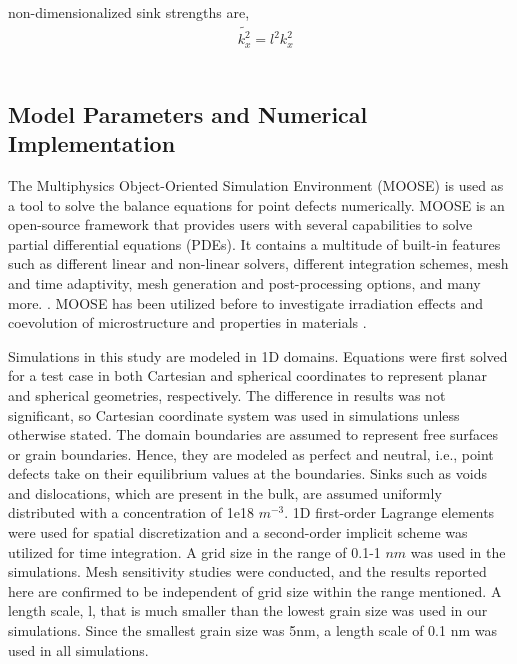 \documentclass[utf8]{frontiersSCNS} %
\begin{document}
    non-dimensionalized sink strengths are,
    \begin{equation}
      \begin{aligned}
        &\widetilde{k_{x}^2}={l^2 k_{x}^2}
      \end{aligned}
      \label{equation:non-dimensionalized_parameters_sink_strength}
    \end{equation}\\
    
\subsection{Model Parameters and Numerical Implementation}

    The Multiphysics Object-Oriented Simulation Environment (MOOSE) is used as a tool to solve the balance equations for point defects numerically. MOOSE is an open-source framework that provides users with several capabilities to solve partial differential equations (PDEs). It contains a multitude of built-in features such as different linear and non-linear solvers, different integration schemes, mesh and time adaptivity, mesh generation and post-processing options, and many more. \citep{permann2020}. MOOSE has been utilized before to investigate irradiation effects and coevolution of microstructure and properties in materials \citep{ahmed2020,tonks2018,ahmed2018,ozturk2018,ozturk2019,abdoelatef2019,badry2019,badry2021}.
    
    Simulations in this study are modeled in 1D domains. Equations were first solved for a test case in both Cartesian and spherical coordinates to represent planar and spherical geometries, respectively. The difference in results was not significant, so Cartesian coordinate system was used in simulations unless otherwise stated. The domain boundaries are assumed to represent free surfaces or grain boundaries. Hence, they are modeled as perfect and neutral, i.e., point defects take on their equilibrium values at the boundaries. Sinks such as voids and dislocations, which are present in the bulk, are assumed uniformly distributed with a concentration of 1e18 $m^{-3}$. 1D first-order Lagrange elements were used for spatial discretization and a second-order implicit scheme was utilized for time integration. A grid size in the range of 0.1-1 $nm$ was used in the simulations. Mesh sensitivity studies were conducted, and the results reported here are confirmed to be independent of grid size within the range mentioned. A length scale, l, that is much smaller than the lowest grain size was used in our simulations. Since the smallest grain size was 5nm, a length scale of 0.1 nm was used in all simulations.
    
\end{document}
